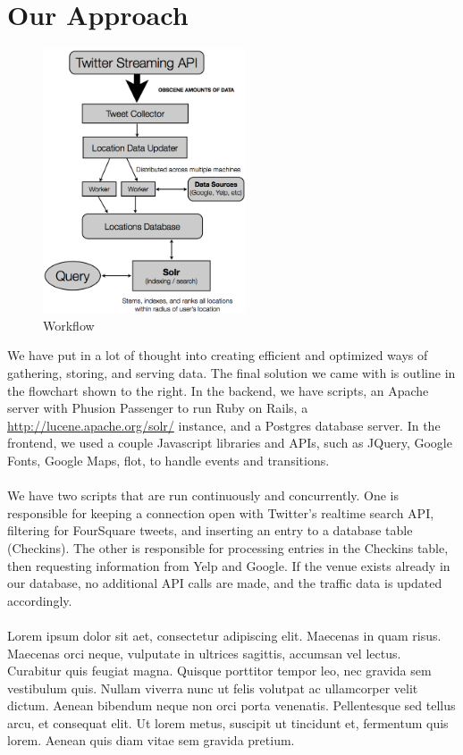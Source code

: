 \documentclass{article}
\begin{document}
\section{Our Approach}
\begin{figure}
\includegraphics[width=6cm]{flowchart.png}
\caption{Workflow}
\end{figure}
We have put in a lot of thought into creating efficient and optimized ways of gathering, storing, and serving data. The final solution
we came with is outline in the flowchart shown to the right. In the backend, we have scripts, an Apache server with Phusion Passenger
to run Ruby on Rails, a \href{Solr}{http://lucene.apache.org/solr/} instance, and a Postgres database server. In the frontend, we used
a couple Javascript libraries and APIs, such as JQuery, Google Fonts, Google Maps, flot, to handle events and transitions. 
\\ \\
We have two scripts that are run continuously and concurrently. One is responsible for keeping a connection open with Twitter's realtime
search API, filtering for FourSquare tweets, and inserting an entry to a database table (Checkins). The other is responsible for processing
entries in the Checkins table, then requesting information from Yelp and Google. If the venue exists already in our database, no additional
API calls are made, and the traffic data is updated accordingly. 
\\ \\


Lorem ipsum dolor sit aet, consectetur adipiscing elit. Maecenas in quam risus. Maecenas orci neque, vulputate in ultrices sagittis, accumsan vel lectus. Curabitur quis feugiat magna. Quisque porttitor tempor leo, nec gravida sem vestibulum quis. Nullam viverra nunc ut felis volutpat ac ullamcorper velit dictum. Aenean bibendum neque non orci porta venenatis. Pellentesque sed tellus arcu, et consequat elit. Ut lorem metus, suscipit ut tincidunt et, fermentum quis lorem. Aenean quis diam vitae sem gravida pretium.
\end{document}
